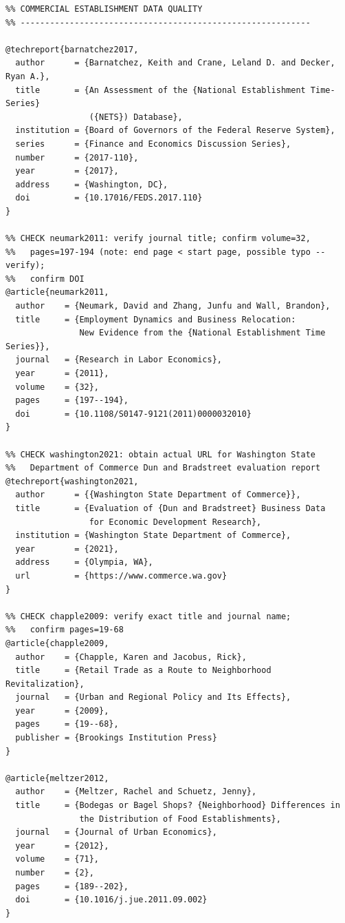 \documentclass[12pt]{article}
\begin{document}
\begin{Verbatim}[fontsize=\small, xleftmargin=0.2in, breaklines=true, breakanywhere=true]
%% -----------------------------------------------------------
%% COMMERCIAL ESTABLISHMENT DATA QUALITY
%% -----------------------------------------------------------

@techreport{barnatchez2017,
  author      = {Barnatchez, Keith and Crane, Leland D. and Decker, Ryan A.},
  title       = {An Assessment of the {National Establishment Time-Series}
                 ({NETS}) Database},
  institution = {Board of Governors of the Federal Reserve System},
  series      = {Finance and Economics Discussion Series},
  number      = {2017-110},
  year        = {2017},
  address     = {Washington, DC},
  doi         = {10.17016/FEDS.2017.110}
}

%% CHECK neumark2011: verify journal title; confirm volume=32,
%%   pages=197-194 (note: end page < start page, possible typo -- verify);
%%   confirm DOI
@article{neumark2011,
  author    = {Neumark, David and Zhang, Junfu and Wall, Brandon},
  title     = {Employment Dynamics and Business Relocation:
               New Evidence from the {National Establishment Time Series}},
  journal   = {Research in Labor Economics},
  year      = {2011},
  volume    = {32},
  pages     = {197--194},
  doi       = {10.1108/S0147-9121(2011)0000032010}
}

%% CHECK washington2021: obtain actual URL for Washington State
%%   Department of Commerce Dun and Bradstreet evaluation report
@techreport{washington2021,
  author      = {{Washington State Department of Commerce}},
  title       = {Evaluation of {Dun and Bradstreet} Business Data
                 for Economic Development Research},
  institution = {Washington State Department of Commerce},
  year        = {2021},
  address     = {Olympia, WA},
  url         = {https://www.commerce.wa.gov}
}

%% CHECK chapple2009: verify exact title and journal name;
%%   confirm pages=19-68
@article{chapple2009,
  author    = {Chapple, Karen and Jacobus, Rick},
  title     = {Retail Trade as a Route to Neighborhood Revitalization},
  journal   = {Urban and Regional Policy and Its Effects},
  year      = {2009},
  pages     = {19--68},
  publisher = {Brookings Institution Press}
}

@article{meltzer2012,
  author    = {Meltzer, Rachel and Schuetz, Jenny},
  title     = {Bodegas or Bagel Shops? {Neighborhood} Differences in
               the Distribution of Food Establishments},
  journal   = {Journal of Urban Economics},
  year      = {2012},
  volume    = {71},
  number    = {2},
  pages     = {189--202},
  doi       = {10.1016/j.jue.2011.09.002}
}


\end{Verbatim}
\end{document}
